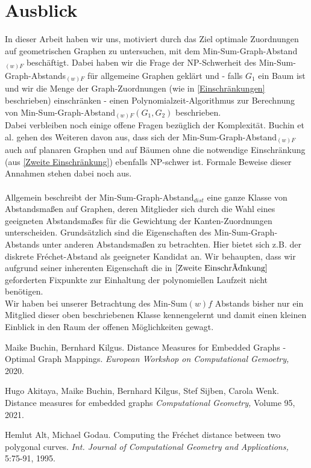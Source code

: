 \documentclass[a4paper, 12pt, twoside]{article}
\theoremstyle{Format1} %
\begin{document}
\section{Ausblick}
In dieser Arbeit haben wir uns, motiviert durch das Ziel optimale Zuordnungen auf geometrischen Graphen zu untersuchen, mit dem
Min-Sum-Graph-Abstand$_{(w)F}$ beschäftigt. Dabei haben wir die Frage der NP-Schwerheit des Min-Sum-Graph-Abstands$_{(w)F}$ für allgemeine
Graphen geklärt und - falls $G_1$ ein Baum ist und wir die Menge der Graph-Zuordnungen (wie in \ref{Einschränkungen} beschrieben) einschränken -
einen Polynomialzeit-Algorithmus zur Berechnung von Min-Sum-Graph-Abstand$_{(w)F}(G_1, G_2)$ beschrieben.
\\
Dabei verbleiben noch einige offene Fragen bezüglich der Komplexität.
Buchin et al. gehen des Weiteren davon aus, dass sich der Min-Sum-Graph-Abstand$_{(w)F}$ auch auf planaren Graphen und
auf Bäumen ohne die notwendige Einschränkung (aus \ref{Zweite Einschränkung}) ebenfalls NP-schwer ist.
Formale Beweise dieser Annahmen stehen dabei noch aus.
\\
\\
Allgemein beschreibt der Min-Sum-Graph-Abstand$_{dist}$ eine ganze Klasse von Abstandsmaßen auf Graphen, deren Mitglieder sich durch die Wahl
eines geeigneten Abstandsmaßes für die Gewichtung der Kanten-Zuordnungen unterscheiden.
Grundsätzlich sind die Eigenschaften des Min-Sum-Graph-Abstands unter anderen Abstandsmaßen zu betrachten. Hier bietet sich z.B. der
diskrete Fréchet-Abstand als geeigneter Kandidat an. Wir behaupten, dass wir aufgrund seiner inherenten Eigenschaft die in $\ref{Zweite Einschränkung}$
geforderten Fixpunkte zur Einhaltung der polynomiellen Laufzeit nicht benötigen.
\\
Wir haben bei unserer Betrachtung des Min-Sum${(w)f}$ Abstands bisher nur ein Mitglied dieser oben beschriebenen Klasse kennengelernt und
damit einen kleinen Einblick in den Raum der offenen Möglichkeiten gewagt.
\newpage\null\thispagestyle{empty}\newpage

\begin{thebibliography}{3}
		Maike Buchin, Bernhard Kilgus. Distance Measures for Embedded Graphs - Optimal Graph Mappings.
		\textit{European Workshop on Computational Gemoetry,} 2020.

		Hugo Akitaya, Maike Buchin, Bernhard Kilgus, Stef Sijben, Carola Wenk. Distance measures for embedded graphs
		\textit{Computational Geometry,} Volume 95, 2021.

		Hemlut Alt, Michael Godau. Computing the Fréchet distance between two polygonal curves.
		\textit{Int. Journal of Computational Geometry and Applications,} 5:75-91, 1995.
\end{thebibliography}


\end{document}
